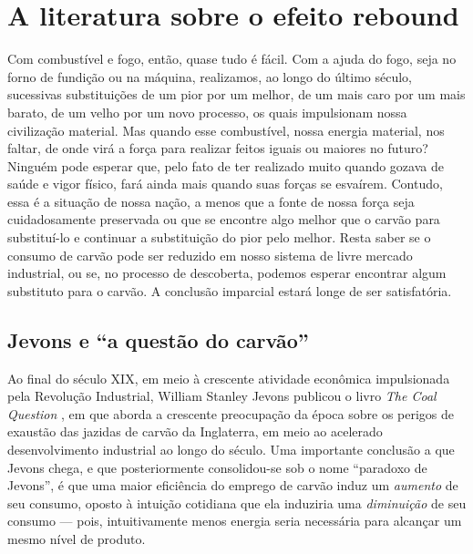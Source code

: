 
%

\setlength{\epigraphwidth}{0.9\textwidth}

\chapter{A literatura sobre o efeito rebound}
\epigraph{Com combustível e fogo, então, quase tudo é fácil. Com a ajuda do fogo, seja no forno de fundição ou na máquina, realizamos, ao longo do último século, sucessivas substituições de um pior por um melhor, de um mais caro por um mais barato, de um velho por um novo processo, os quais impulsionam nossa civilização material. Mas quando esse combustível, nossa energia material, nos faltar, de onde virá a força para realizar feitos iguais ou maiores no futuro? Ninguém pode esperar que, pelo fato de ter realizado muito quando gozava de saúde e vigor físico, fará ainda mais quando suas forças se esvaírem. Contudo, essa é a situação de nossa nação, a menos que a fonte de nossa força seja cuidadosamente preservada ou que se encontre algo melhor que o carvão para substituí-lo e continuar a substituição do pior pelo melhor. Resta saber se o consumo de carvão pode ser reduzido em nosso sistema de livre mercado industrial, ou se, no processo de descoberta, podemos esperar encontrar algum substituto para o carvão. A conclusão imparcial estará longe de ser satisfatória.}{\parencite[p. 72]{Jevons1866}}

\section{Jevons e ``a questão do carvão''}
Ao final do século XIX, em meio à crescente atividade econômica impulsionada pela Revolução Industrial, William Stanley Jevons publicou o livro \textit{The Coal Question} \citeyear{Jevons1866}, em que aborda a crescente preocupação da época sobre os perigos de exaustão das jazidas de carvão da Inglaterra, em meio ao acelerado desenvolvimento industrial ao longo do século. Uma importante conclusão a que Jevons chega, e que posteriormente consolidou-se sob o nome ``paradoxo de Jevons'', é que uma maior eficiência do emprego de carvão induz um \textit{aumento} de seu consumo, oposto à intuição cotidiana que ela induziria uma \textit{diminuição} de seu consumo --- pois, intuitivamente menos energia seria necessária para alcançar um mesmo nível de produto. 

